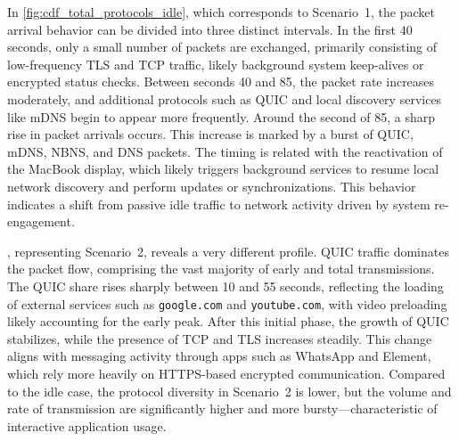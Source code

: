 \documentclass[sigconf,nonacm]{acmart}
\begin{document}
In \cref{fig:cdf_total_protocols_idle}, which corresponds to Scenario~1, the packet arrival behavior can be divided into three distinct intervals. In the first 40 seconds, only a small number of packets are exchanged, primarily consisting of low-frequency TLS and TCP traffic, likely background system keep-alives or encrypted status checks. Between seconds 40 and 85, the packet rate increases moderately, and additional protocols such as QUIC and local discovery services like mDNS begin to appear more frequently. Around the second of 85, a sharp rise in packet arrivals occurs. This increase is marked by a burst of QUIC, mDNS, NBNS, and DNS packets. The timing is related with the reactivation of the MacBook display, which likely triggers background services to resume local network discovery and perform updates or synchronizations. This behavior indicates a shift from passive idle traffic to network activity driven by system re-engagement.

, representing Scenario~2, reveals a very different profile. QUIC traffic dominates the packet flow, comprising the vast majority of early and total transmissions. The QUIC share rises sharply between 10 and 55 seconds, reflecting the loading of external services such as \texttt{google.com} and \texttt{youtube.com}, with video preloading likely accounting for the early peak. After this initial phase, the growth of QUIC stabilizes, while the presence of TCP and TLS increases steadily. This change aligns with messaging activity through apps such as WhatsApp and Element, which rely more heavily on HTTPS-based encrypted communication. Compared to the idle case, the protocol diversity in Scenario~2 is lower, but the volume and rate of transmission are significantly higher and more bursty—characteristic of interactive application usage.




\end{document}
